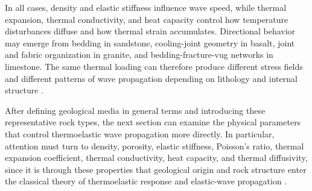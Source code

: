 In all cases, density and elastic stiffness influence wave speed, while thermal expansion, thermal conductivity, and heat capacity control how temperature disturbances diffuse and how thermal strain accumulates. Directional behavior may emerge from bedding in sandstone, cooling-joint geometry in basalt, joint and fabric organization in granite, and bedding-fracture-vug networks in limestone. The same thermal loading can therefore produce different stress fields and different patterns of wave propagation depending on lithology and internal structure \cite{mavko2009,robertson1988,aki2002,schultz2019}.

After defining geological media in general terms and introducing these representative rock types, the next section can examine the physical parameters that control thermoelastic wave propagation more directly. In particular, attention must turn to density, porosity, elastic stiffness, Poisson's ratio, thermal expansion coefficient, thermal conductivity, heat capacity, and thermal diffusivity, since it is through these properties that geological origin and rock structure enter the classical theory of thermoelastic response and elastic-wave propagation \cite{aki2002,mavko2009,robertson1988}.